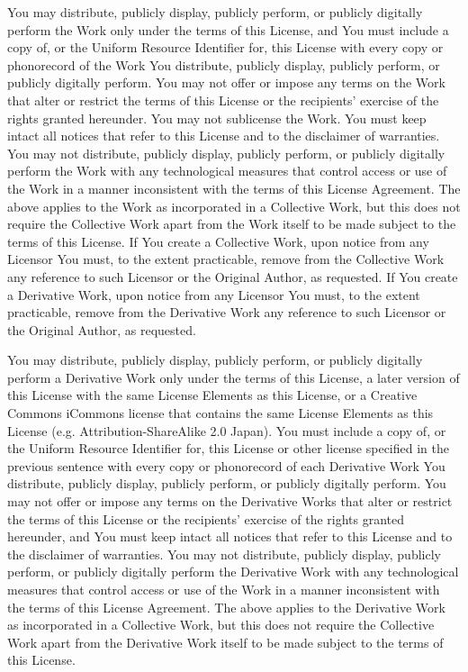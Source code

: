 You may distribute, publicly display, publicly perform, or publicly digitally perform the Work only under the terms of this License, and You must include a copy of, or the Uniform Resource Identifier for, this License with every copy or phonorecord of the Work You distribute, publicly display, publicly perform, or publicly digitally perform. You may not offer or impose any terms on the Work that alter or restrict the terms of this License or the recipients' exercise of the rights granted hereunder. You may not sublicense the Work. You must keep intact all notices that refer to this License and to the disclaimer of warranties. You may not distribute, publicly display, publicly perform, or publicly digitally perform the Work with any technological measures that control access or use of the Work in a manner inconsistent with the terms of this License Agreement. The above applies to the Work as incorporated in a Collective Work, but this does not require the Collective Work apart from the Work itself to be made subject to the terms of this License. If You create a Collective Work, upon notice from any Licensor You must, to the extent practicable, remove from the Collective Work any reference to such Licensor or the Original Author, as requested. If You create a Derivative Work, upon notice from any Licensor You must, to the extent practicable, remove from the Derivative Work any reference to such Licensor or the Original Author, as requested.

You may distribute, publicly display, publicly perform, or publicly digitally perform a Derivative Work only under the terms of this License, a later version of this License with the same License Elements as this License, or a Creative Commons iCommons license that contains the same License Elements as this License (e.g. Attribution-ShareAlike 2.0 Japan). You must include a copy of, or the Uniform Resource Identifier for, this License or other license specified in the previous sentence with every copy or phonorecord of each Derivative Work You distribute, publicly display, publicly perform, or publicly digitally perform. You may not offer or impose any terms on the Derivative Works that alter or restrict the terms of this License or the recipients' exercise of the rights granted hereunder, and You must keep intact all notices that refer to this License and to the disclaimer of warranties. You may not distribute, publicly display, publicly perform, or publicly digitally perform the Derivative Work with any technological measures that control access or use of the Work in a manner inconsistent with the terms of this License Agreement. The above applies to the Derivative Work as incorporated in a Collective Work, but this does not require the Collective Work apart from the Derivative Work itself to be made subject to the terms of this License.

